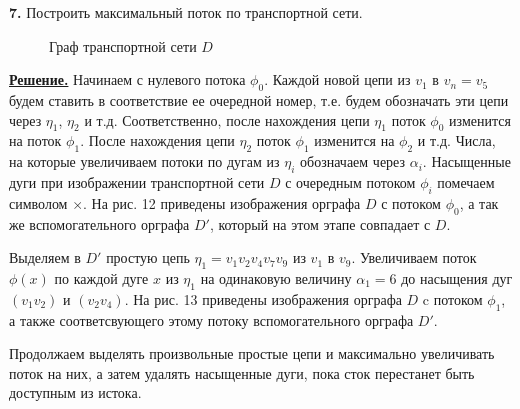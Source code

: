 \documentclass[12pt, letterpaper, titlepage]{article}
\begin{document}
\textbf{7.} Построить максимальный поток по транспортной сети.
\begin{figure}[H]\centering\caption{Граф транспортной сети $D$}\end{figure}
\underline{\textbf{Решение.}} Начинаем с нулевого потока $\phi_0$. Каждой новой цепи из $v_1$ в
$v_n=v_5$ будем ставить в соответствие ее очередной номер, т.е. будем обозначать эти цепи через
$\eta_1$, $\eta_2$ и т.д. Соответственно, после нахождения цепи $\eta_1$ поток $\phi_0$ изменится
на поток $\phi_1$. После нахождения цепи $\eta_2$ поток $\phi_1$ изменится на $\phi_2$ и т.д.
Числа, на которые увеличиваем потоки по дугам из $\eta_i$ обозначаем через $\alpha_i$. Насыщенные
дуги при изображении транспортной сети $D$ с очередным потоком $\phi_i$ помечаем символом
$\times$. На рис. 12 приведены изображения орграфа $D$ с потоком $\phi_0$, а так же вспомогательного
орграфа $D'$, который на этом этапе совпадает с $D$. 
\begin{figure}[H]
    \centering
    \begin{minipage}{0.48\linewidth}
        
        \caption*{$\phi_0$}
    \end{minipage}
    \begin{minipage}{0.48\linewidth}
        
        \caption*{$D'$}
    \end{minipage}
    \caption{}
\end{figure}
Выделяем в $D'$ простую цепь $\eta_1=v_1v_2v_4v_7v_9$ из $v_1$ в $v_9$. Увеличиваем
поток $\phi(x)$ по каждой дуге $x$ из $\eta_1$ на одинаковую величину $\alpha_1=6$
до насыщения дуг $(v_1v_2)$ и $(v_2v_4)$. На рис. 13 приведены изображения орграфа
$D$ c потоком $\phi_1$, а также соответсвующего этому потоку вспомогательного орграфа $D'$.
\begin{figure}[H]
    \centering
    \begin{minipage}{0.48\linewidth}
        
        \caption*{$\phi_1$}
    \end{minipage}
    \begin{minipage}{0.48\linewidth}
        
        \caption*{$D'$}
    \end{minipage}
    \caption{}
\end{figure}
Продолжаем выделять произвольные простые цепи и максимально увеличивать поток на них,
а затем удалять насыщенные дуги, пока сток перестанет быть доступным из истока.
\end{document}
